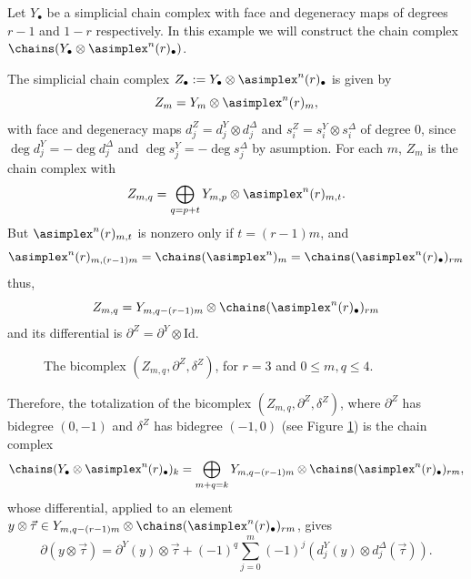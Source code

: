 \begin{example}\label{Chains_tensor}
Let $Y_\bullet$ be a simplicial chain complex with face and degeneracy maps of degrees $r-1$ and $1-r$ respectively. In this example we will construct the chain complex $\chains(Y_\bullet \otimes \asimplex^n(r)_\bullet)$.

The simplicial chain complex $Z_\bullet:=Y_\bullet \otimes \asimplex^n(r)_\bullet$ is given by 
\[
Z_m=Y_m \otimes \asimplex^n(r)_m,
\]
with face and degeneracy maps $d^Z_j=d^Y_j\otimes d^\Delta_j$ and $s^Z_i=s^Y_i\otimes s^\Delta_i$ of degree $0$, since $\deg d^Y_j=-\deg d^\Delta_j$ and $\deg s^Y_j=-\deg s^\Delta_j$ by asumption. 
For each $m$, $Z_m$ is the chain complex with
\[
Z_{m,q}=\bigoplus_{q=p+t}Y_{m,p}\otimes\asimplex^n(r)_{m,t}.
\]
But $\asimplex^n(r)_{m,t}$ is nonzero only if $t=(r-1)m$, and 
\[
\asimplex^n(r)_{m,(r-1)m}= \chains(\asimplex^n)_m=\chains(\asimplex^n(r)_\bullet)_{rm}
\]
thus, 
\[
Z_{m,q}=Y_{m,q-(r-1)m}\otimes\chains(\asimplex^n(r)_\bullet)_{rm}
\]
and its differential is $\partial^Z=\partial^Y\otimes \mathrm{Id}$.

\begin{figure}[ht!]
	
	\caption{The bicomplex $(Z_{m,q},\partial^Z,\delta^Z)$, for $r=3$ and $0\leq m,q\leq 4$.}
	\label{fig YDelta}
\end{figure}

Therefore, the totalization of the bicomplex $(Z_{m,q},\partial^Z,\delta^Z)$, where $\partial^Z$ has bidegree $(0,-1)$ and $\delta^Z$ has bidegree $(-1,0)$ (see Figure \ref{fig YDelta}) is the chain complex
\[
\chains(Y_\bullet\otimes\asimplex^n(r)_\bullet)_k=\bigoplus_{m+q=k}Y_{m,q-(r-1)m}\otimes\chains(\asimplex^n(r)_\bullet)_{rm},
\]
whose differential, applied to an element $y\otimes\vec{\tau}\in Y_{m,q-(r-1)m}\otimes\chains(\asimplex^n(r)_\bullet)_{rm}$, gives
\[
\partial(y\otimes \vec{\tau}) = \partial^Y(y)\otimes \vec{\tau} + (-1)^q\sum_{j=0}^m(-1)^j\left (d^Y_j(y)\otimes d^\Delta_j(\vec{\tau})\right ).
\]
\end{example}

